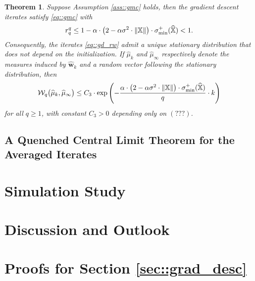 \documentclass{article}
\newcommand*{\bbX}{\mathbb{X}}
\newcommand*{\bfw}{\mathbf{w}}
\newcommand*{\calW}{\mathcal{W}}
\newcommand*{\sigminp}{\sigma_{\mathrm{min}}^+}
\DeclarePairedDelimiter{\norm}{\lVert}{\rVert}
\newcommand{\whweight}{\widehat{\bfw}}
\newcommand{\whbbX}{\widehat{\bbX}}
\newtheorem{theorem}[lemma]{Theorem}
\begin{document}
\begin{theorem}
  \label{thm::stat_dist}
  Suppose Assumption \ref{ass::gmc} holds, then the gradient descent iterates
  satisfy \eqref{eq::gmc} with \begin{align*}
    r_q^q \leq 1 - \alpha \cdot \big(2 - \alpha \sigma^2 \cdot \norm{\bbX}\big)
    \cdot \sigminp(\whbbX) < 1.
  \end{align*} Consequently, the iterates \eqref{eq::gd_rw} admit a unique
  stationary distribution that does not depend on the initialization. If
  $\widehat{\mu}_k$ and $\widehat{\mu}_\infty$ respectively denote the measures
  induced by $\whweight_k$ and a random vector following the stationary
  distribution, then \begin{align*}
    \calW_q\big(\widehat{\mu}_k, \widehat{\mu}_\infty\big) \leq C_3 \cdot
    \exp\left(- \dfrac{\alpha \cdot \big(2 - \alpha \sigma^2 \cdot
    \norm{\bbX}\big) \cdot \sigminp(\whbbX)}{q} \cdot k\right)
  \end{align*} for all $q \geq 1$, with constant $C_3 > 0$ depending only on
  $(???)$.
\end{theorem}

\subsection{A Quenched Central Limit Theorem for the Averaged Iterates}

\section{Simulation Study}

\section{Discussion and Outlook}


\printbibliography


\appendix

\section{Proofs for Section \ref{sec::grad_desc}}
\label{sec::grad_desc_proof}
\end{document}
